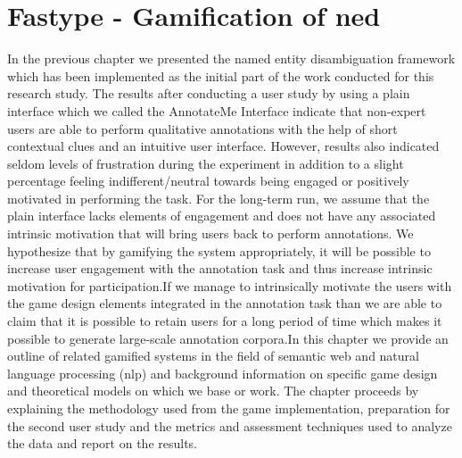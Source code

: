 \chapter{Fastype - Gamification of \ac{ned}}
\label{chap:gamechapter}
In the previous chapter we presented the named entity disambiguation framework which has been implemented as the initial part of the work conducted for this research study. The results after conducting a user study by using a plain interface which we called the AnnotateMe Interface indicate that non-expert users are able to perform qualitative annotations with the help of short contextual clues and an intuitive user interface. However, results also indicated seldom levels of frustration during the experiment in addition to a slight percentage feeling indifferent/neutral towards being engaged or positively motivated in performing the task. For the long-term run, we assume that the plain interface lacks elements of engagement and does not have any associated intrinsic motivation that will bring users back to perform annotations. We hypothesize that by gamifying the system appropriately, it will be possible to increase user engagement with the annotation task and thus increase intrinsic motivation for participation.\if If we manage to intrinsically motivate the users with the game design elements integrated in the annotation task than we are able to claim that it is possible to retain users for a long period of time which makes it possible to generate large-scale annotation corpora.\fi In this chapter we provide an outline of related gamified systems in the field of semantic web and natural language processing (\ac{nlp}) and background information on specific game design and theoretical models on which we base or work. The chapter proceeds by explaining the methodology used from the game implementation, preparation for the second user study and the metrics and assessment techniques used to analyze the data and report on the results. 




\newpage

\newpage
